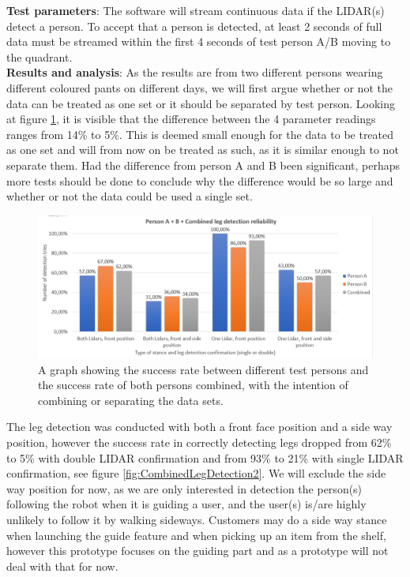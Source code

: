 \textbf{Test parameters}: The software will stream continuous data if the LIDAR(s) detect a person. To accept that a person is detected, at least 2 seconds of full data must be streamed within the first 4 seconds of test person A/B moving to the quadrant.\\

\textbf{Results and analysis}:
As the results are from two different persons wearing different coloured pants on different days, we will first argue whether or not the data can be treated as one set or it should be separated by test person. Looking at figure \ref{fig:CombinedLegDetector}, it is visible that the difference between the 4 parameter readings ranges from 14\% to 5\%. This is deemed small enough for the data to be treated as one set and will from now on be treated as such, as it is similar enough to not separate them. Had the difference from person A and B been significant, perhaps more tests should be done to conclude why the difference would be so large and whether or not the data could be used a single set.\\

\begin{figure}[H]
    \centering
    \includegraphics[width=1\textwidth]{figures/CombinedLegDetector.png}
    \caption{A graph showing the success rate between different test persons and the success rate of both persons combined, with the intention of combining or separating the data sets.}
    \label{fig:CombinedLegDetector}
\end{figure}

The leg detection was conducted with both a front face position and a side way position, however the success rate in correctly detecting legs dropped from 62\% to 5\% with double LIDAR confirmation and from 93\% to 21\% with single LIDAR confirmation, see figure \ref{fig:CombinedLegDetection2}. We will exclude the side way position for now, as we are only interested in detection the person(s) following the robot when it is guiding a user, and the user(s) is/are highly unlikely to follow it by walking sideways. Customers may do a side way stance when launching the guide feature and when picking up an item from the shelf, however this prototype focuses on the guiding part and as a prototype will not deal with that for now.

